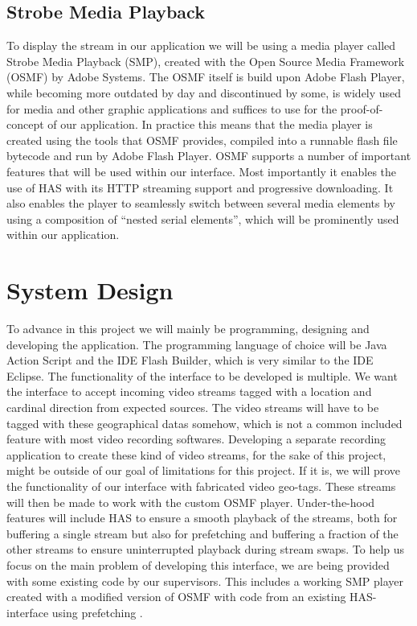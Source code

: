 \documentclass[9pt,a4paper]{acmproc}
\begin{document}
\subsection{Strobe Media Playback}

To display the stream in our application we will be using a media player called Strobe Media Playback (SMP), created with the Open Source Media Framework (OSMF) by Adobe Systems. The OSMF itself is build upon Adobe Flash Player, while becoming more outdated by day and discontinued by some, is widely used for media and other graphic applications and suffices to use for the proof-of-concept of our application. In practice this means that the media player is created using the tools that OSMF provides, compiled into a runnable flash file bytecode and run by Adobe Flash Player. 
OSMF supports a number of important features that will be used within our interface. Most importantly it enables the use of HAS with its HTTP streaming support and progressive downloading. It also enables the player to seamlessly switch between several media elements by using a composition of “nested serial elements”, which will be prominently used within our application.\cite{osmf}

\section{System Design}

To advance in this project we will mainly be programming, designing and developing the application. The programming language of choice will be Java Action Script and the IDE Flash Builder, which is very similar to the IDE Eclipse. The functionality of the interface to be developed is multiple. We want the interface to accept incoming video streams tagged with a location and cardinal direction from expected sources. The video streams will have to be tagged with these geographical datas somehow, which is not a common included feature with most video recording softwares. Developing a separate recording application to create these kind of video streams, for the sake of this project, might be outside of our goal of limitations for this project. If it is, we will prove the functionality of our interface with fabricated video geo-tags. These streams will then be made to work with the custom OSMF player.  Under-the-hood features will include HAS to ensure a smooth playback of the streams, both for buffering a single stream but also for prefetching and buffering a fraction of the other streams to ensure uninterrupted playback during stream swaps. To help us focus on the main problem of developing this interface, we are being provided with some existing code by our supervisors. This includes a working SMP player created with a modified version of OSMF with code from an existing HAS-interface using prefetching \cite{qualbranch}.
\end{document}
